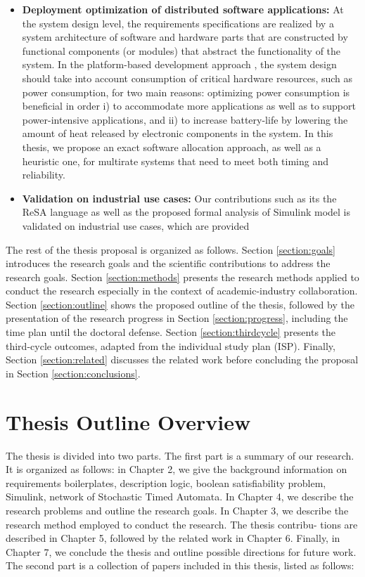 \begin{itemize}
    \item \textbf{Deployment optimization of distributed software applications: }
    At the system design level, the requirements specifications are realized by a system architecture of software and hardware parts that are constructed by functional components (or modules) that abstract the functionality of the system. In the platform-based development approach \cite{Sangiovanni-Vincentelli2004BenefitsDesign}, the system design should take into account consumption of critical hardware resources, such as power consumption, for two main reasons: optimizing power consumption is beneficial in order i) to accommodate more applications as well as to support power-intensive applications, and ii) to increase battery-life by lowering the amount of heat released by electronic components in the system. In this thesis, we propose an exact software allocation approach, as well as a heuristic one, for multirate systems that need to meet both timing and reliability.
    \item \textbf{Validation on industrial use cases: } 
    Our contributions such as its the ReSA language as well as the proposed formal analysis of Simulink model is validated on industrial use cases, which are provided
\end{itemize}

The rest of the thesis proposal is organized as follows. Section \ref{section:goals} introduces the research goals and the scientific contributions to address the research goals. Section \ref{section:methods} presents the research methods applied to conduct the research especially in the context of academic-industry collaboration. Section \ref{section:outline} shows the proposed outline of the thesis, followed by the presentation of the research progress in Section \ref{section:progress}, including the time plan until the doctoral defense. Section \ref{section:thirdcycle} presents the third-cycle outcomes, adapted from the individual study plan (ISP). Finally, Section \ref{section:related} discusses the related work before concluding the proposal in Section \ref{section:conclusions}.

\section{Thesis Outline Overview}
The thesis is divided into two parts. The first part is a summary of our research. It is organized as follows: in Chapter 2, we give the background information on requirements boilerplates, description logic, boolean satisfiability problem, Simulink, network of Stochastic Timed Automata. In Chapter 4, we describe the research problems and outline the research goals. In Chapter 3, we describe the research method employed to conduct the research. The thesis contribu- tions are described in Chapter 5, followed by the related work in Chapter 6. Finally, in Chapter 7, we conclude the thesis and outline possible directions for future work.
The second part is a collection of papers included in this thesis, listed as follows: